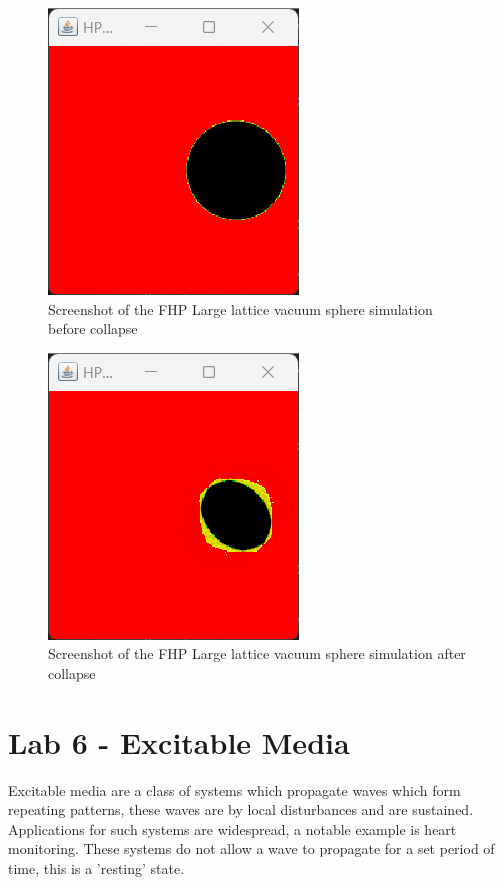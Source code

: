 \begin{figure}[H] 
   \centering
   \includegraphics[width=0.49\columnwidth]{Figures/Week 5/large-lattice/W5-vac-before-collision.png}
   \caption{Screenshot of the FHP Large lattice vacuum sphere simulation before collapse}
   \label{fig:W5-large-lattice-vac-start}
\end{figure}

\begin{figure}[H] 
   \centering
   \includegraphics[width=0.49\columnwidth]{Figures/Week 5/large-lattice/W5-vac-after-collision.png}
   \caption{Screenshot of the FHP Large lattice vacuum sphere simulation after collapse}
   \label{fig:W5-large-lattice-vac-end}
\end{figure}



\newpage
\section{Lab 6 - Excitable Media} 
Excitable media are a class of systems which propagate waves which form repeating patterns, these waves are by local disturbances and are sustained. Applications for such systems are widespread, a notable example is heart monitoring. These systems do not allow a wave to propagate for a set period of time, this is a 'resting' state.


